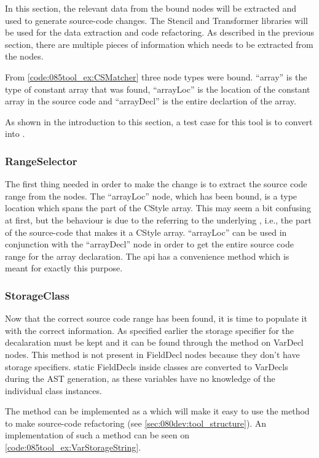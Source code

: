 In this section, the relevant data from the bound nodes will be extracted and used to generate source-code changes. The Stencil and Transformer libraries will be used for the data extraction and code refactoring.
As described in the previous section, there are multiple pieces of information which needs to be extracted from the nodes. 

From \cref{code:085tool_ex:CSMatcher} three node types were bound. ``array'' is the type of constant array that was found, ``arrayLoc'' is the location of the constant array in the source code and ``arrayDecl'' is the entire declartion of the array.

As shown in the introduction to this section, a test case for this tool is to convert  into .

\subsubsection*{RangeSelector}
The first thing needed in order to make the change is to extract the source code range from the nodes. The ``arrayLoc'' node, which has been bound, is a type location which spans the \cppinline{[2]} part of the CStyle array.
This may seem a bit confusing at first, but the behaviour is due to the  referring to the underlying , i.e., the part of the source-code that makes it a CStyle array.
``arrayLoc'' can be used in conjunction with the ``arrayDecl'' node in order to get the entire source code range for the array declaration. The  api has a convenience method  which is meant for exactly this purpose.

\subsubsection*{StorageClass}
Now that the correct source code range has been found, it is time to populate it with the correct information. As specified earlier the storage specifier for the decalaration must be kept and it can be found through the  method on VarDecl nodes. This method is not present in FieldDecl nodes because they don't have storage specifiers. static FieldDecls inside classes are converted to VarDecls during the AST generation, as these variables have no knowledge of the individual class instances. 

The  method can be implemented as a  which will make it easy to use the method to make source-code refactoring (see \cref{sec:080dev:tool_structure}). An implementation of such a method can be seen on \cref{code:085tool_ex:VarStorageString}.

